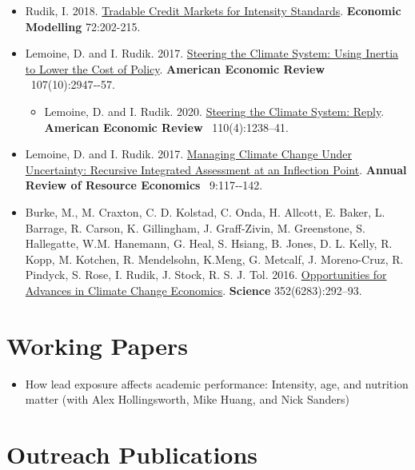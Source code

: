 \documentclass{res} %
\begin{document}
\begin{resume}
\begin{itemize}
	\item[] Rudik, I. 2018. \href{https://www.sciencedirect.com/science/article/pii/S0264999317315651}{Tradable Credit Markets for Intensity Standards}. \textbf{Economic Modelling} 72:202-215.
	\item[] Lemoine, D. and I. Rudik. 2017.  \href{http://papers.ssrn.com/sol3/papers.cfm?abstract_id=2443594}{Steering the Climate System: Using Inertia to Lower the Cost of Policy}. \textbf{American Economic Review}  107(10):2947‐-57.
	\begin{itemize}
		\item[] Lemoine, D. and I. Rudik. 2020.  \href{http://papers.ssrn.com/sol3/papers.cfm?abstract_id=2443594}{Steering the Climate System: Reply}. \textbf{American Economic Review}  110(4):1238--41.
	\end{itemize}
	\item[] Lemoine, D. and I. Rudik. 2017. \href{https://papers.ssrn.com/sol3/papers.cfm?abstract_id=2862211}{Managing Climate Change Under Uncertainty: Recursive Integrated Assessment at an Inflection Point}.  \textbf{Annual Review of Resource Economics}  9:117‐-142.
	\item[]  Burke, M., M. Craxton, C. D. Kolstad, C. Onda, H. Allcott, E. Baker, L. Barrage, R. Carson, K. Gillingham, J. Graff-Zivin, M. Greenstone, S. Hallegatte, W.M. Hanemann, G. Heal, S. Hsiang, B. Jones, D. L. Kelly, R. Kopp, M. Kotchen, R. Mendelsohn, K.Meng, G. Metcalf, J. Moreno-Cruz, R. Pindyck, S. Rose, I. Rudik, J. Stock, R. S. J. Tol. 2016. \href{http://science.sciencemag.org/content/352/6283/292.abstract}{Opportunities for Advances in Climate Change Economics}. \textbf{Science} 352(6283):292--93.
\end{itemize}
\vspace{-.075in}

\section{Working Papers}

\begin{itemize} %
	\item[] How lead exposure affects academic performance: Intensity, age, and nutrition matter (with Alex Hollingsworth, Mike Huang, and Nick Sanders)
\end{itemize}
\vspace{-.075in}
\section{Outreach Publications}


\end{resume}
\end{document}
